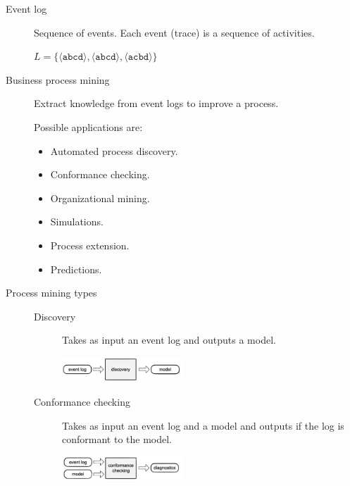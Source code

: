 \begin{description}
    \item[Event log] 
        Sequence of events.
        Each event (trace) is a sequence of activities.

        \begin{example}
            $L = \{ \langle \texttt{abcd} \rangle, \langle \texttt{abcd} \rangle, \langle \texttt{acbd} \rangle \}$
        \end{example}

    \item[Business process mining] 
        Extract knowledge from event logs to improve a process.

        Possible applications are:
        \begin{itemize}
            \item Automated process discovery.
            \item Conformance checking.
            \item Organizational mining.
            \item Simulations.
            \item Process extension.
            \item Predictions.
        \end{itemize}

    \item[Process mining types] \phantom{}
        \begin{description}
            \item[Discovery] 
                Takes as input an event log and outputs a model.
                \begin{center}
                    \includegraphics[width=0.4\textwidth]{img/process_mining_discovery.png}
                \end{center}

            \item[Conformance checking] 
                Takes as input an event log and a model and outputs if the log is conformant to the model.
                \begin{center}
                    \includegraphics[width=0.4\textwidth]{img/process_mining_conformance.png}
                \end{center}


\end{description}
\end{description}
